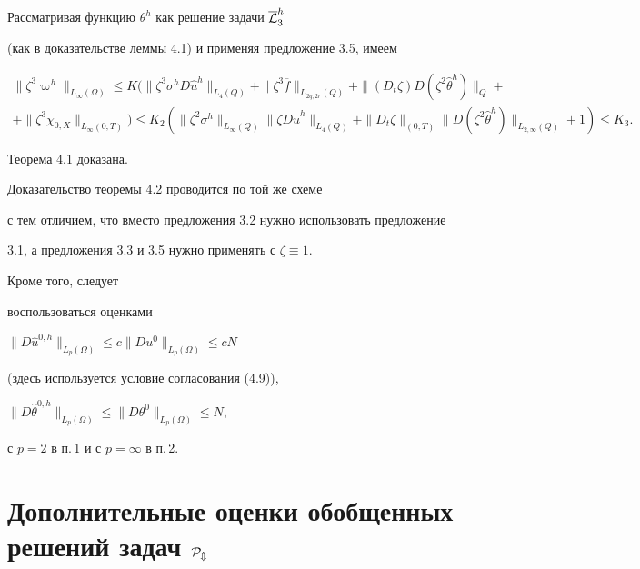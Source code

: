 Рассматривая функцию $\theta^h$ как решение задачи $\overline{\cal L}_3^h$


(как в доказательстве леммы 4.1) и применяя предложение 3.5, имеем


\begin{multline*}


\|\zeta^3\varpi^h\|_{L_{\infty}(\Omega)}\le K(


\|\zeta^3\sigma^hD\widehat u^h\|_{L_4(Q)}


+\|\zeta^3\overline f\|_{L_{2q,2r}(Q)}+


\|(D_t\zeta)D(\zeta^2\widehat\theta^h)\|_Q+\\


+\|\zeta^3\chi_{0,X}\|_{L_{\infty}(0,T)})


\le K_2(


\|\zeta^2\sigma^h\|_{L_{\infty}(Q)}\|\zeta D\widehat u^h\|_{L_4(Q)}+


\|D_t\zeta\|_{(0,T)}\|D(\zeta^2\widehat\theta^h)\|_{L_{2,\infty}(Q)}+1)


\le K_3.


\end{multline*}


Теорема 4.1 доказана.





Доказательство теоремы 4.2 проводится по той же схеме


с тем отличием, что вместо предложения 3.2 нужно использовать предложение


3.1, а предложения 3.3 и 3.5 нужно применять с $\zeta\equiv 1$.


Кроме того, следует


 воспользоваться оценками


$\|D\widehat u^{0,h}\|_{L_p(\Omega)}\le c\|Du^0\|_{L_p(\Omega)}\le cN$


(здесь используется условие согласования (4.9)),


$\|D\widehat \theta^{0,h}\|_{L_p(\Omega)}\le \|D\theta^0\|_{L_p(\Omega)}\le N$,


с $p=2$ в п.\,1 и с $p=\infty$ в п.\,2.





\section{Дополнительные оценки обобщенных решений задач $\cal P_m$}





